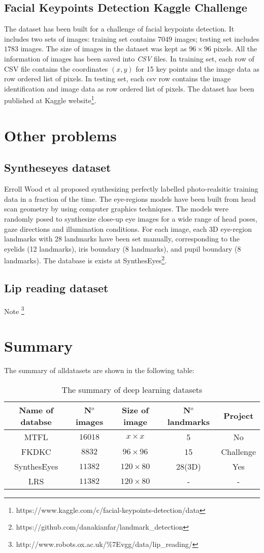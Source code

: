 \subsection{Facial Keypoints Detection Kaggle Challenge}
The dataset has been built for a challenge of facial keypoints detection. It includes two sets of images: training set contains $7049$ images; testing set includes $1783$ images. The size of images in the dataset was kept as $96 \times 96$ pixels. All the information of images has been saved into \textit{CSV} files. In training set, each row of CSV file contains the coordinates $(x,y)$ for 15 key points and the image data as row ordered list of pixels. In testing set, each csv row contains the image identification and image data as row ordered list of pixels. The dataset has been published at Kaggle website\footnote{https://www.kaggle.com/c/facial-keypoints-detection/data}.
\section{Other problems}
\subsection{Syntheseyes dataset}
Erroll Wood et al \cite{wood2015_iccv} proposed synthesizing perfectly labelled photo-realsitic training data in a fraction of the time. The eye-regions models have been built from head scan geometry by using computer graphics techniques. The models were randomly posed to synthesize close-up eye images for a wide range of head poses, gaze directions and illumination conditions. For each image, each 3D eye-region landmarks with 28 landmarks have been set manually, corresponding to the eyelids (12 landmarks), iris boundary (8 landmarks), and pupil boundary (8 landmarks).
The database is exists at SynthesEyes\footnote{https://github.com/danakianfar/landmark\_detection}.
\subsection{Lip reading dataset}
Note \footnote{http://www.robots.ox.ac.uk/$\%$7Evgg/data/lip\_reading/}
\section{Summary}
The summary of alldatasets are shown in the following table:\\
\begin{table}[!h]
	\centering
	\begin{tabular}{*{5}{c}}
		Name of databse & N$^{o}$ images & Size of image & N$^{o}$ landmarks & Project \\ \hline
		MTFL & $16018$ & $x \times x$ & 5 & No \\ \hline
		FKDKC & $8832$ & $96 \times 96$ & 15 & Challenge \\ \hline
		SynthesEyes & $11382$ & $120 \times 80$ & 28(3D) & Yes \\ \hline
		LRS & $11382$ & $120 \times 80$ & - & - \\ \hline
	\end{tabular}
	\caption{The summary of deep learning datasets}
	\label{tb4}
\end{table}
